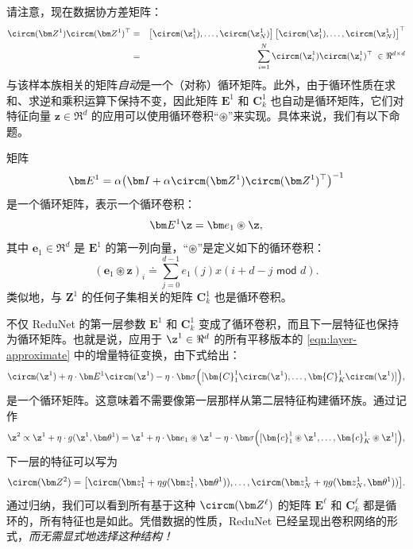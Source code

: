 \documentclass[../../book-main_zh.tex]{subfiles}
\begin{document}
请注意，现在数据协方差矩阵：
\begin{eqnarray}
    \circm(\bm Z^1) \circm(\bm Z^1)^\top
    &=& \left[ \circm(\z_{1}^1), \dots, \circm(\z_{N}^1) \right]
    \left[ \circm(\z_{1}^1), \dots, \circm (\z_{N}^1) \right]^\top \nonumber \\
    &=& \sum_{i =1}^N \circm(\z_{i}^1) \circm(\z_{i}^1)^\top \;\in
    \Re^{d\times d}
\end{eqnarray}
与该样本族相关的矩阵{\em 自动}是一个（对称）循环矩阵。此外，由于循环性质在求和、求逆和乘积运算下保持不变，因此矩阵 $\bm E^1$ 和 $\bm C^1_k$ 也自动是循环矩阵，它们对特征向量 $\bm z \in \Re^d$ 的应用可以使用循环卷积“$\circledast$”来实现。具体来说，我们有以下命题。

\begin{proposition}[$\bm E^1$ 和 $\bm C^1_k$ 的卷积结构]
    矩阵
    \begin{equation}
        \bm E^1 = \alpha\big(\bm I + \alpha \circm(\bm Z^1)
        \circm(\bm Z^1)^\top \big)^{-1}
    \end{equation}
    是一个循环矩阵，表示一个循环卷积：
    $$\bm E^1 \z = \bm e_1 \circledast \z,$$
    其中 $\bm e_1 \in \Re^d$ 是 $\bm E^1$ 的第一列向量，“$\circledast$”是定义如下的循环卷积：
    \begin{equation*}
        (\bm e_1 \circledast \bm z)_{i} \doteq \sum_{j=0}^{d-1}
        e_1(j) x(i+ d-j \,\, \textsf{mod} \,\,d).
    \end{equation*}
    类似地，与 $\bm Z^1$ 的任何子集相关的矩阵 $\bm C^1_k$ 也是循环卷积。
    \label{prop:circular-conv-1}
\end{proposition}

不仅 ReduNet 的第一层参数 $\bm E^1$ 和 $\bm{C}^1_k$ 变成了循环卷积，而且下一层特征也保持为循环矩阵。也就是说，应用于 $\z^1 \in \Re^d$ 的所有平移版本的 \eqref{eqn:layer-approximate} 中的增量特征变换，由下式给出：
\begin{equation}
    \circm(\z^1) + \eta \cdot \bm E^1 \circm(\z^1) - \eta \cdot \bm
    \sigma \Big([\bm{C}_1^1 \circm(\z^1), \ldots, \bm{C}^1_K
    \circm(\z^1)] \Big),
\end{equation}
是一个循环矩阵。这意味着不需要像第一层那样从第二层特征构建循环族。通过记作
\begin{equation}
    \z^{2} \propto \z^{1} +\eta \cdot g(\z^{1}, \bm \theta^{1}) =
    \z^1 + \eta \cdot \bm e_{1} \circledast \z^{1} -  \eta \cdot \bm
    \sigma\Big([\bm{c}_{1}^{1} \circledast \z^{1}, \dots,
    \bm{c}^{1}_{K} \circledast \z^{1}]\Big),
    \label{eqn:approximate-convolution}
\end{equation}
下一层的特征可以写为
$$\circm(\bm Z^2) = \big[ \circm( \bm z_{1}^1 + \eta g( \bm z_{1}^1,
    \bm \theta^1)), \dots, \circm( \bm z_{N}^1 + \eta g(\bm z_{N}^1, \bm
\theta^1)) \big].$$
通过归纳，我们可以看到所有基于这种 $\circm(\bm Z^\ell)$ 的矩阵 $\bm E^\ell$ 和 $\bm C^\ell_k$ 都是循环的，所有特征也是如此。凭借数据的性质，ReduNet 已经呈现出卷积网络的形式，{\em 而无需显式地选择这种结构！}
\end{document}

